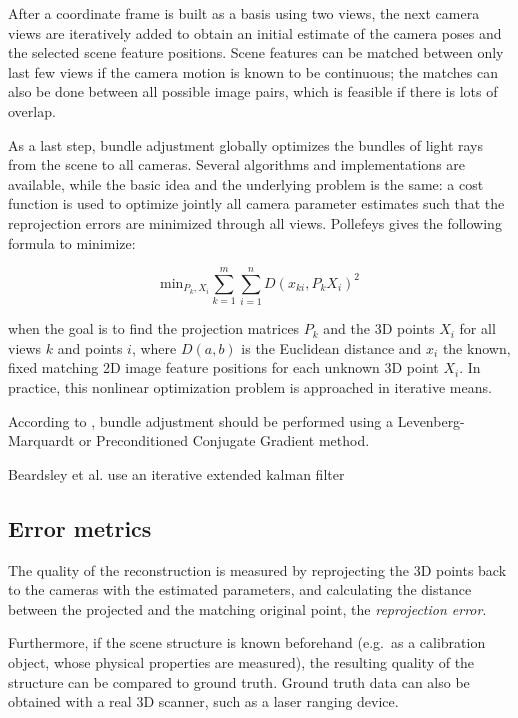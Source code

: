 After a coordinate frame is built as a basis using two views, the next camera views are iteratively added to obtain an initial estimate of the camera poses and the selected scene feature positions.
Scene features can be matched between only last few views if the camera motion is known to be continuous;
the matches can also be done between all possible image pairs, which is feasible if there is lots of overlap.

As a last step, bundle adjustment globally optimizes the bundles of light rays from the scene to all cameras.
Several algorithms and implementations are available, while the basic idea and the underlying problem is the same:
a cost function is used to optimize jointly all camera parameter estimates such that the reprojection errors are minimized through all views.
Pollefeys \cite{tutorial} gives the following formula to minimize:

\begin{equation}
	\text{min}_{P_k, X_i} \sum_{k=1}^m \sum_{i=1}^n D(x_{ki}, P_k X_i)^2
\end{equation}

when the goal is to find the projection matrices $P_k$ and the 3D points $X_i$ for all views $k$ and points $i$, where $D(a,b)$ is the Euclidean distance and $x_i$ the known, fixed matching 2D image feature positions for each unknown 3D point $X_i$.
In practice, this nonlinear optimization problem is approached in iterative means.

According to \cite{wu2013towards}, bundle adjustment should be performed using a Levenberg-Marquardt or Preconditioned Conjugate Gradient method.

Beardsley et al. use an iterative extended kalman filter \cite{beardsley1997sequential}


\subsection{Error metrics} %

The quality of the reconstruction is measured by reprojecting the 3D points back to the cameras with the estimated parameters, and calculating the distance between the projected and the matching original point, the \emph{reprojection error}. \cite{hartley03multiview}

Furthermore, if the scene structure is known beforehand (e.g.\ as a calibration object, whose physical properties are measured), the resulting quality of the structure can be compared to ground truth.
Ground truth data can also be obtained with a real 3D scanner, such as a laser ranging device. %


